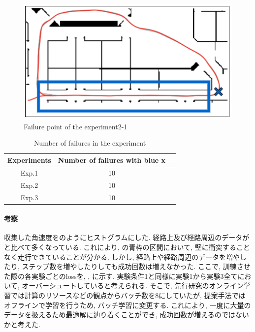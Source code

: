 \begin{figure}[h]
  \centering
  \includegraphics[keepaspectratio, scale=0.5]{images/result2.png}
  \caption{Failure point of the experiment2-1}
  \label{Fig:result2}
  \end{figure}

\begin{table}[h]
  \centering
  \begin{tabular}{|c|c|c|} \hline
    Experiments & Number of failures with blue x \\ \hline
    Exp.1 & 10 \\ \hline
    Exp.2 & 10 \\ \hline
    Exp.3 & 10 \\ \hline
  \end{tabular}
  \caption{Number of failures in the experiment}
  \label{tb:fail2}
\end{table}

\newpage
\paragraph{考察}
収集した角速度をのようにヒストグラムにした. 経路上及び経路周辺のデータがと比べて多くなっている. これにより, の青枠の区間において, 壁に衝突することなく走行できていることが分かる. しかし, 経路上や経路周辺のデータを増やしたり, ステップ数を増やしたりしても成功回数は増えなかった. ここで, 訓練させた際の各実験ごとのlossを, , に示す. 実験条件1と同様に実験1から実験3全てにおいて, オーバーシュートしていると考えられる. そこで, 先行研究のオンライン学習では計算のリソースなどの観点からバッチ数を8にしていたが, 提案手法ではオフラインで学習を行うため, バッチ学習に変更する. これにより, 一度に大量のデータを扱えるため最適解に辿り着くことができ, 成功回数が増えるのではないかと考えた. 

